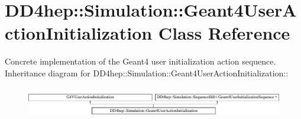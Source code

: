 \hypertarget{class_d_d4hep_1_1_simulation_1_1_geant4_user_action_initialization}{
\section{DD4hep::Simulation::Geant4UserActionInitialization Class Reference}
\label{class_d_d4hep_1_1_simulation_1_1_geant4_user_action_initialization}
}


Concrete implementation of the Geant4 user initialization action sequence.  
Inheritance diagram for DD4hep::Simulation::Geant4UserActionInitialization::\begin{figure}[H]
\begin{center}
\leavevmode
\includegraphics[height=1.33017cm]{class_d_d4hep_1_1_simulation_1_1_geant4_user_action_initialization}
\end{center}
\end{figure}
